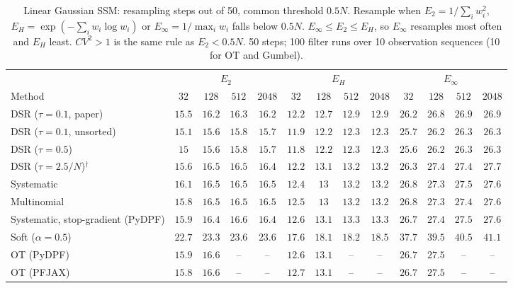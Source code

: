 \begin{table}[ht]
\centering
\small
\caption{Linear Gaussian SSM: resampling steps out of 50, common threshold $0.5N$. Resample when $E_2=1/\sum_iw_i^2$, $E_H=\exp(-\sum_iw_i\log w_i)$ or $E_\infty=1/\max_iw_i$ falls below $0.5N$. $E_\infty\le E_2\le E_H$, so $E_\infty$ resamples most often and $E_H$ least. $CV^2>1$ is the same rule as $E_2<0.5N$. 50 steps; 100 filter runs over 10 observation sequences (10 for OT and Gumbel).}
\label{tab:trigger-fixed-linear-resampling_steps}
\begin{adjustbox}{max width=\linewidth}
\begin{tabular}{lcccc|cccc|cccc}
\toprule
 & \multicolumn{4}{c}{$E_2$} & \multicolumn{4}{c}{$E_H$} & \multicolumn{4}{c}{$E_\infty$} \\
\cmidrule(lr){2-5} \cmidrule(lr){6-9} \cmidrule(lr){10-13}
Method & $32$ & $128$ & $512$ & $2048$ & $32$ & $128$ & $512$ & $2048$ & $32$ & $128$ & $512$ & $2048$ \\
\midrule
DSR ($\tau{=}0.1$, paper) & $15.5$ & $16.2$ & $16.3$ & $16.2$ & $12.2$ & $12.7$ & $12.9$ & $12.9$ & $26.2$ & $26.8$ & $26.9$ & $26.9$ \\
DSR ($\tau{=}0.1$, unsorted) & $15.1$ & $15.6$ & $15.8$ & $15.7$ & $11.9$ & $12.2$ & $12.3$ & $12.3$ & $25.7$ & $26.2$ & $26.3$ & $26.3$ \\
DSR ($\tau{=}0.5$) & $15$ & $15.6$ & $15.8$ & $15.7$ & $11.8$ & $12.2$ & $12.3$ & $12.3$ & $25.6$ & $26.2$ & $26.3$ & $26.3$ \\
DSR ($\tau{=}2.5/N$)$^\dagger$ & $15.6$ & $16.5$ & $16.5$ & $16.4$ & $12.2$ & $13.1$ & $13.2$ & $13.2$ & $26.3$ & $27.4$ & $27.4$ & $27.7$ \\
\midrule
Systematic & $16.1$ & $16.5$ & $16.5$ & $16.5$ & $12.4$ & $13$ & $13.2$ & $13.2$ & $26.8$ & $27.3$ & $27.5$ & $27.6$ \\
Multinomial & $15.8$ & $16.5$ & $16.5$ & $16.5$ & $12.5$ & $13$ & $13.2$ & $13.2$ & $26.8$ & $27.3$ & $27.4$ & $27.6$ \\
Systematic, stop-gradient (PyDPF) & $15.9$ & $16.4$ & $16.6$ & $16.4$ & $12.6$ & $13.1$ & $13.3$ & $13.3$ & $26.7$ & $27.4$ & $27.5$ & $27.6$ \\
Soft ($\alpha{=}0.5$) & $22.7$ & $23.3$ & $23.6$ & $23.6$ & $17.6$ & $18.1$ & $18.2$ & $18.5$ & $37.7$ & $39.5$ & $40.5$ & $41.1$ \\
OT (PyDPF) & $15.9$ & $16.6$ & -- & -- & $12.6$ & $13.1$ & -- & -- & $26.7$ & $27.5$ & -- & -- \\
OT (PFJAX) & $15.8$ & $16.6$ & -- & -- & $12.7$ & $13.1$ & -- & -- & $26.7$ & $27.5$ & -- & -- \\

\end{tabular}
\end{adjustbox}
\end{table}
